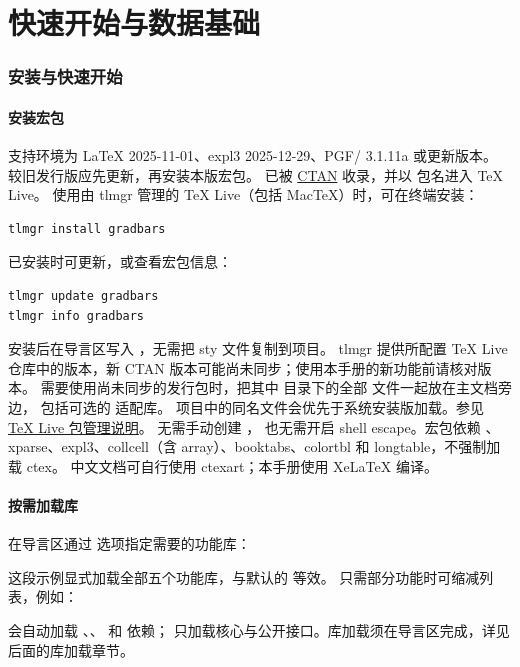 \part{快速开始与数据基础}


\section{安装与快速开始}
\subsection{安装宏包}
支持环境为 LaTeX 2025-11-01、expl3 2025-12-29、PGF/\manualTikZ{} 3.1.11a 或更新版本。
较旧发行版应先更新，再安装本版宏包。
 已被 \href{https://ctan.org/pkg/gradbars}{CTAN} 收录，并以  包名进入 TeX Live。
使用由 tlmgr 管理的 TeX Live（包括 MacTeX）时，可在终端安装：
\begin{lstlisting}[style=manual,language={}]
tlmgr install gradbars
\end{lstlisting}
已安装时可更新，或查看宏包信息：
\begin{lstlisting}[style=manual,language={}]
tlmgr update gradbars
tlmgr info gradbars
\end{lstlisting}
安装后在导言区写入 \key{\usepackage{gradbars}}，无需把 sty 文件复制到项目。
tlmgr 提供所配置 TeX Live 仓库中的版本，新 CTAN 版本可能尚未同步；使用本手册的新功能前请核对版本。
需要使用尚未同步的发行包时，把其中  目录下的全部  文件一起放在主文档旁边，
包括可选的  适配库。
项目中的同名文件会优先于系统安装版加载。参见 \href{https://tug.org/texlive/doc/tlmgr.html}{TeX Live 包管理说明}。
无需手动创建 ，
也无需开启 shell escape。宏包依赖 \manualTikZ{}、xparse、expl3、collcell（含 array）、booktabs、colortbl 和 longtable，不强制加载 ctex。
中文文档可自行使用 ctexart；本手册使用 XeLaTeX 编译。

\subsection{按需加载库}
在导言区通过  选项指定需要的功能库：
\begin{codeonly}
\usepackage[libraries={stack,spark,heat,csv,table}]{gradbars}
\end{codeonly}
这段示例显式加载全部五个功能库，与默认的 \key{\usepackage{gradbars}} 等效。
只需部分功能时可缩减列表，例如：
\begin{codeonly}
\usepackage[libraries={stack,spark,heat}]{gradbars}
\end{codeonly}
 会自动加载 、、 和  依赖；
 只加载核心与公开接口。库加载须在导言区完成，详见后面的库加载章节。

